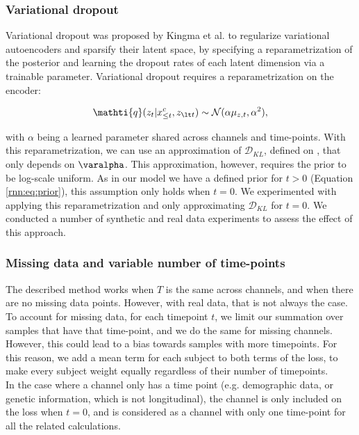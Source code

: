\subsubsection{Variational dropout} 

Variational dropout was proposed by Kingma et al. \cite{Kingma2015} to regularize variational autoencoders and sparsify their latent space, by specifying a reparametrization of the posterior and learning the dropout rates of each latent dimension via a trainable parameter. Variational dropout requires a reparametrization on the encoder:

\begin{equation}
    \mathti{q}(z_t | x^c_{\leq t}, z_{\lt t}) \sim \mathcal{N}(\alpha\mu_{z,t},\alpha^2),
\end{equation}

with $\alpha$ being a learned parameter shared across channels and time-points. With this reparametrization, we can use an approximation of $\mathcal{D}_{KL}$, defined on \cite{Kingma2015}, that only depends on $\varalpha$. This approximation, however, requires the prior to be log-scale uniform. As in our model we have a defined prior for $t>0$ (Equation \ref{rnn:eq:prior}), this assumption only holds when $t=0$. We experimented with applying this reparametrization and only approximating $\mathcal{D}_{KL}$ for $t=0$. We conducted a number of synthetic and real data experiments to assess the effect of this approach.

\subsubsection{Missing data and variable number of time-points}

The described method works when $T$ is the same across channels, and when there are no missing data points. However, with real data, that is not always the case. To account for missing data, for each timepoint $t$, we limit our summation over samples that have that time-point, and we do the same for missing channels. However, this could lead to a bias towards samples with more timepoints. For this reason, we add a mean term for each subject to both terms of the loss, to make every subject weight equally regardless of their number of timepoints. \\

In the case where a channel only has a time point (e.g. demographic data, or genetic information, which is not longitudinal), the channel is only included on the loss when $t=0$, and is considered as a channel with only one time-point for all the related calculations.

